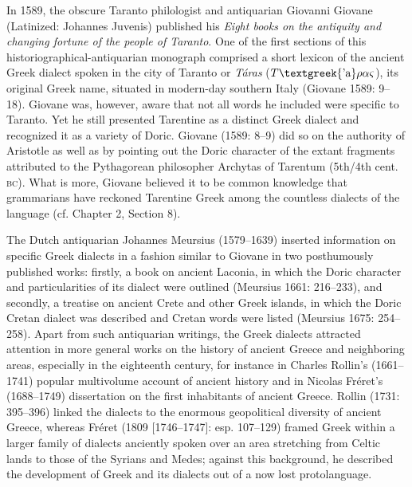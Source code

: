 \begin{styleStandard}
In 1589, the obscure Taranto philologist and antiquarian Giovanni Giovane (Latinized: Johannes Juvenis) published his \textit{Eight books on the antiquity and changing fortune of the people of Taranto}. One of the first sections of this historiographical-antiquarian monograph comprised a short lexicon of the ancient Greek dialect spoken in the city of Taranto or \textit{Táras} ($T\text{\textgreek{'a}}\rho \alpha \varsigma $), its original Greek name, situated in modern-day southern Italy (Giovane 1589: 9–18). Giovane was, however, aware that not all words he included were specific to Taranto. Yet he still presented Tarentine as a distinct Greek dialect and recognized it as a variety of Doric. Giovane (1589: 8–9) did so on the authority of Aristotle as well as by pointing out the Doric character of the extant fragments attributed to the Pythagorean philosopher Archytas of Tarentum (5th/4th cent. \textsc{bc}). What is more, Giovane believed it to be common knowledge that grammarians have reckoned Tarentine Greek among the countless dialects of the language (cf. Chapter 2, Section 8).
\end{styleStandard}

\begin{styleStandard}
The Dutch antiquarian Johannes Meursius (1579–1639) inserted information on specific Greek dialects in a fashion similar to Giovane in two posthumously published works: firstly, a book on ancient Laconia, in which the Doric character and particularities of its dialect were outlined (Meursius 1661: 216–233), and secondly, a treatise on ancient Crete and other Greek islands, in which the Doric Cretan dialect was described and Cretan words were listed (Meursius 1675: 254–258). Apart from such antiquarian writings, the Greek dialects attracted attention in more general works on the history of ancient Greece and neighboring areas, especially in the eighteenth century, for instance in Charles Rollin’s (1661–1741) popular multivolume account of ancient history and in Nicolas Fréret’s (1688–1749) dissertation on the first inhabitants of ancient Greece. Rollin (1731: 395–396) linked the dialects to the enormous geopolitical diversity of ancient Greece, whereas Fréret (1809 [1746–1747]: esp. 107–129) framed Greek within a larger family of dialects anciently spoken over an area stretching from Celtic lands to those of the Syrians and Medes; against this background, he described the development of Greek and its dialects out of a now lost protolanguage.
\end{styleStandard}

